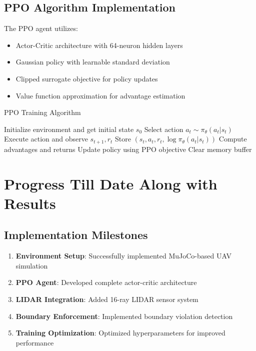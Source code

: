 \documentclass[12pt,a4paper]{article}
\begin{document}
\subsection{PPO Algorithm Implementation}
The PPO agent utilizes:
\begin{itemize}
    \item Actor-Critic architecture with 64-neuron hidden layers
    \item Gaussian policy with learnable standard deviation
    \item Clipped surrogate objective for policy updates
    \item Value function approximation for advantage estimation
\end{itemize}

\begin{algorithm}
\caption{PPO Training Algorithm}
\begin{algorithmic}
    \STATE Initialize environment and get initial state $s_0$
        \STATE Select action $a_t \sim \pi_\theta(a_t|s_t)$
        \STATE Execute action and observe $s_{t+1}, r_t$
        \STATE Store $(s_t, a_t, r_t, \log\pi_\theta(a_t|s_t))$
            \STATE Compute advantages and returns
            \STATE Update policy using PPO objective
            \STATE Clear memory buffer
        \ENDIF
    \ENDFOR
\ENDFOR
\end{algorithmic}
\end{algorithm}

\section{Progress Till Date Along with Results}

\subsection{Implementation Milestones}
\begin{enumerate}
    \item \textbf{Environment Setup}: Successfully implemented MuJoCo-based UAV simulation
    \item \textbf{PPO Agent}: Developed complete actor-critic architecture
    \item \textbf{LIDAR Integration}: Added 16-ray LIDAR sensor system
    \item \textbf{Boundary Enforcement}: Implemented boundary violation detection
    \item \textbf{Training Optimization}: Optimized hyperparameters for improved performance
\end{enumerate}
\end{document}
